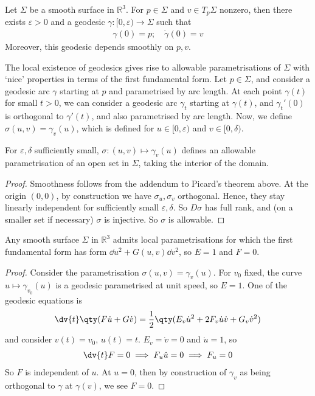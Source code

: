 \begin{corollary}
	Let $\Sigma$ be a smooth surface in $\mathbb R^3$.
	For $p \in \Sigma$ and $v \in T_p \Sigma$ nonzero, then there exists $\varepsilon > 0$ and a geodesic $\gamma \colon [0,\varepsilon) \to \Sigma$ such that
	\begin{align*}
		\gamma(0) = p;\quad \dot \gamma(0) = v
	\end{align*}
	Moreover, this geodesic depends smoothly on $p,v$.
\end{corollary}
The local existence of geodesics gives rise to allowable parametrisations of $\Sigma$ with `nice' properties in terms of the first fundamental form.
Let $p \in \Sigma$, and consider a geodesic arc $\gamma$ starting at $p$ and parametrised by arc length.
At each point $\gamma(t)$ for small $t > 0$, we can consider a geodesic arc $\gamma_t$ starting at $\gamma(t)$, and $\gamma_t'(0)$ is orthogonal to $\gamma'(t)$, and also parametrised by arc length.
Now, we define $\sigma(u,v) = \gamma_v(u)$, which is defined for $u \in [0,\varepsilon)$ and $v \in [0,\delta)$.
\begin{lemma}
	For $\varepsilon, \delta$ sufficiently small, $\sigma \colon (u,v) \mapsto \gamma_v(u)$ defines an allowable parametrisation of an open set in $\Sigma$, taking the interior of the domain.
\end{lemma}
\begin{proof}
	Smoothness follows from the addendum to Picard's theorem above.
	At the origin $(0,0)$, by construction we have $\sigma_u, \sigma_v$ orthogonal.
	Hence, they stay linearly independent for sufficiently small $\varepsilon, \delta$.
	So $D\sigma$ has full rank, and (on a smaller set if necessary) $\sigma$ is injective.
	So $\sigma$ is allowable.
\end{proof}
\begin{corollary}
	Any smooth surface $\Sigma$ in $\mathbb R^3$ admits local parametrisations for which the first fundamental form has form $\dd{u}^2 + G(u,v) \dd{v}^2$, so $E = 1$ and $F = 0$.
\end{corollary}
\begin{proof}
	Consider the parametrisation $\sigma(u,v) = \gamma_v(u)$.
	For $v_0$ fixed, the curve $u \mapsto \gamma_{v_0}(u)$ is a geodesic parametrised at unit speed, so $E = 1$.
	One of the geodesic equations is
	\begin{align*}
		\dv{t} \qty(F \dot u + G \dot v) = \frac{1}{2} \qty(E_v \dot u^2 + 2F_v \dot u \dot v + G_v \dot v^2)
	\end{align*}
	and consider $v(t) = v_0$, $u(t) = t$.
	$E_v = \dot v = 0$ and $\dot u = 1$, so
	\begin{align*}
		\dv{t} F = 0 \implies F_u \dot u = 0 \implies F_u = 0
	\end{align*}
	So $F$ is independent of $u$.
	At $u = 0$, then by construction of $\gamma_v$ as being orthogonal to $\gamma$ at $\gamma(v)$, we see $F = 0$.
\end{proof}
